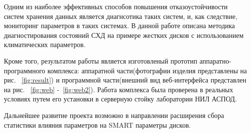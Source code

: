 \conclusion
Одним из наиболее эффективных способов повышения отказоустойчивости систем хранения данных является диагнсотика таких систем, и, как следствие, мониторинг параметров в таких системах. 
В данной работе описана методика диагностирования состояний СХД на примере жестких дисков с использованием климатических параметров.

Кроме того, результатом работы является изготовленый прототип аппаратно-программного комплекса: аппаратной части(фотографии изделия представлены на рис. ~\ref{fig:result}) и программной части(внешний вид веб-интерфейса представлен на рис. ~\ref{fig:web} -~\ref{fig:web2}). Работа комплекса была проверена в реальных условиях путем его установки в серверную стойку лаборатории НИЛ АСПОД. 

Дальнейшее развитие проекта возможно в направлении расширения сбора статистики влияния параметров на SMART параметры дисков.